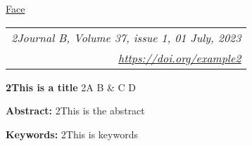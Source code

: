 \documentclass{eclab-beamer}
\begin{document}
\begin{frame}[allowframebreaks]{\color{black} \normalsize{\ul{Face}} \hfill
\begin{tabular}{r}
\textit{2Journal B, Volume 37, issue 1, 01 July, 2023}\\
\href{https://doi.org/example2}{\color{blue} \footnotesize{\ul{\textit{https://doi.org/example2}}}}
\end{tabular}}

\textbf{\Large{2This is a title}}
\vspace{1mm}
2A B \& C D

\hspace*{\fill}


\textbf{Abstract:}
2This is the abstract

\textbf{Keywords:} 2This is keywords
\end{frame}
\end{document}
